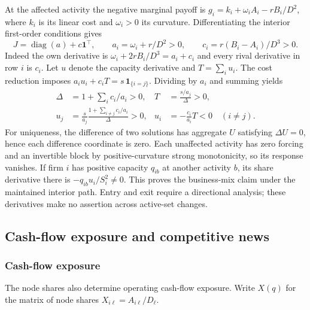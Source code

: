 At the affected activity the negative marginal payoff is $g_i=k_i+\omega_i
A_i-rB_i/D^2$, where $k_i$ is its linear cost and $\omega_i>0$ its curvature.
Differentiating the interior first-order conditions gives
\begin{equation}\label{eq:separable-jacobian}
  J=\operatorname{diag}(a)+c\mathbf1^\top,\qquad
  a_i=\omega_i+r/D^2>0,\qquad c_i=r(B_i-A_i)/D^3>0.
\end{equation}
Indeed the own derivative is $\omega_i+2rB_i/D^3=a_i+c_i$ and every rival
derivative in row $i$ is $c_i$.
Let $u$ denote the capacity derivative and $T=\sum_i u_i$.
The cost reduction imposes $a_i u_i+c_i T=s\,\mathbf{1}_{\{i=j\}}$.
Dividing by $a_i$ and summing yields
\begin{equation}\label{eq:separable-response}
  \begin{aligned}
    \Delta&=1+\sum_i c_i/a_i>0,&
    T&=\frac{s/a_j}{\Delta}>0,\\
    u_j&=\frac{s}{a_j}\frac{1+\sum_{i\ne j}c_i/a_i}{\Delta}>0,&
    u_i&=-\frac{c_i}{a_i}T<0\quad(i\ne j).
  \end{aligned}
\end{equation}
For uniqueness, the difference of two solutions has aggregate $U$ satisfying
$\Delta U=0$, hence each difference coordinate is zero.
Each unaffected activity has zero forcing and an invertible block by
positive-curvature strong monotonicity, so its response vanishes.
If firm $i$ has positive capacity $q_{ib}$ at another activity $b$, its share
derivative there is $-q_{ib}u_i/S_i^2\ne0$.
This proves the business-mix claim under the maintained interior path.
Entry and exit require a directional analysis; these derivatives make no
assertion across active-set changes.



\subsection{Cash-flow exposure and competitive news}\label{app:cash-flow-support}

\subsubsection{Cash-flow exposure}

The node shares also determine operating cash-flow exposure.
Write $X(q)$ for the matrix of node shares
$X_{i\ell}=A_{i\ell}/D_\ell$.

